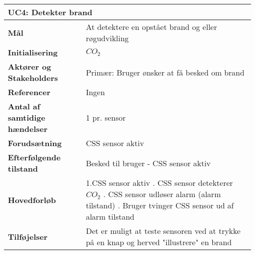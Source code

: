 \begin{table}[H] \centering
\begin{tabular}{|p{6cm}|p{8cm}|}
	\hline
\multicolumn{2}{|l|}{\textbf{UC4: Detekter brand}} \\\hline
\textbf{Mål}								&At detektere en opstået brand og eller røgudvikling \\\hline
\textbf{Initialisering}					& $CO_2$ \\\hline
\textbf{Aktører og Stakeholders}			&Primær: Bruger ønsker at få besked om brand \\\hline
\textbf{Referencer}						& Ingen \\\hline
\textbf{Antal af samtidige hændelser}	& 1 pr. sensor \\\hline
\textbf{Forudsætning}					& CSS sensor aktiv  \\\hline
\textbf{Efterfølgende tilstand}			& Besked til bruger - CSS sensor aktiv \\\hline
\textbf{Hovedforløb}						&  
1.CSS sensor aktiv \newline 
2. CSS sensor detekterer $CO_2$ \newline 
3. CSS sensor udløser alarm (alarm tilstand) \newline 
4. Bruger tvinger CSS sensor ud af alarm tilstand\\\hline
\textbf{Tilføjelser}						& Det er muligt at teste sensoren ved at trykke på en knap og herved "illustrere" en brand  \\\hline
	\end{tabular}
	\label{UC4} 
\end{table}